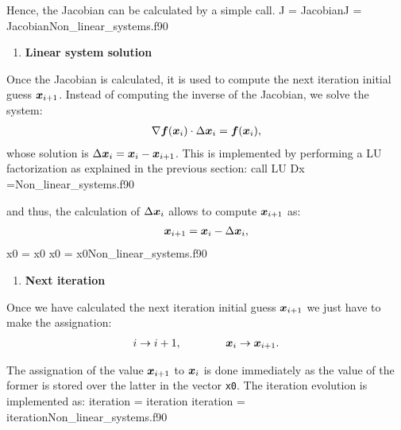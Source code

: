       Hence, the Jacobian can be calculated by a simple call.
      \vspace{0.5cm} 
      {J = Jacobian}{J = Jacobian}{Non_linear_systems.f90}
      
      \begin{enumerate}[resume]
      	\item \textbf{Linear system solution}
      \end{enumerate}
      Once the Jacobian is calculated, it is used to compute the next iteration initial guess $\boldsymbol{x}_{i+1}$. Instead of computing the inverse of the Jacobian, we solve the system:
      \begin{align}
      	\nabla\boldsymbol{f}(\boldsymbol{x}_i)\cdot\Delta \boldsymbol{x}_i
      	=
      	\boldsymbol{f}(\boldsymbol{x}_i) ,
      \end{align}
      whose solution is $\Delta \boldsymbol{x}_i=\boldsymbol{x}_i-\boldsymbol{x}_{i+1}$. This is implemented by performing a LU factorization as explained in the previous section:
      \vspace{0.5cm} 
      {call LU}
      {Dx =}{Non_linear_systems.f90}
      
      
      and thus, the calculation of $\Delta \boldsymbol{x}_i$ allows to compute $\boldsymbol{x}_{i+1}$ as:
      \begin{align*}
      	\boldsymbol{x}_{i+1} = \boldsymbol{x}_{i} - \Delta \boldsymbol{x}_i,
      \end{align*}
      \vspace{0.5cm} 
      {x0 = x0}
      {x0 = x0}{Non_linear_systems.f90}
      
      \begin{enumerate}[resume]
      	\item \textbf{Next iteration}
      \end{enumerate}
      Once we have calculated the next iteration initial guess $\boldsymbol{x}_{i+1}$ we just have to make the assignation:
      \begin{align}
      	i \rightarrow i+1, \qquad \qquad \boldsymbol{x}_{i} \rightarrow \boldsymbol{x}_{i+1}.
      \end{align}
      
      The assignation of the value $\boldsymbol{x}_{i+1}$ to $\boldsymbol{x}_{i}$ is done immediately as the value of the former is stored over the latter in the vector \verb|x0|. The iteration evolution is implemented as:
      \vspace{0.5cm} 
      {iteration = iteration}
      {iteration = iteration}{Non_linear_systems.f90}
      
